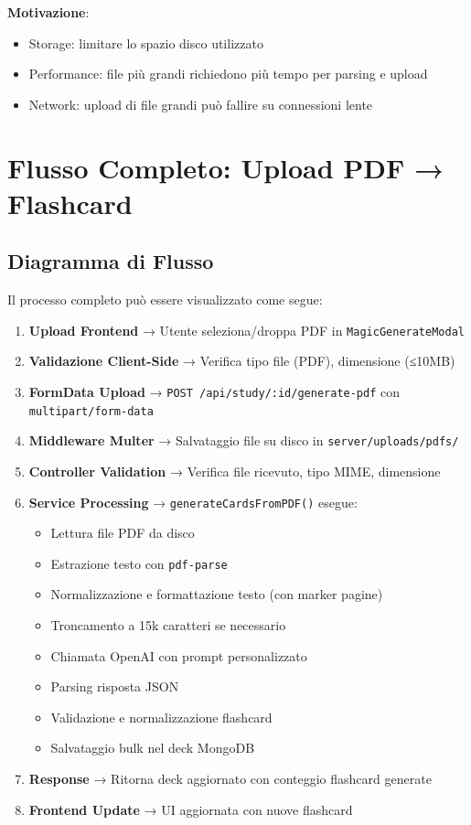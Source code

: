 \documentclass[11pt,a4paper]{article}
\begin{document}
\textbf{Motivazione}:
\begin{itemize}
    \item Storage: limitare lo spazio disco utilizzato
    \item Performance: file più grandi richiedono più tempo per parsing e upload
    \item Network: upload di file grandi può fallire su connessioni lente
\end{itemize}

\section{Flusso Completo: Upload PDF → Flashcard}

\subsection{Diagramma di Flusso}

Il processo completo può essere visualizzato come segue:

\begin{enumerate}
    \item \textbf{Upload Frontend} → Utente seleziona/droppa PDF in \texttt{MagicGenerateModal}
    \item \textbf{Validazione Client-Side} → Verifica tipo file (PDF), dimensione (≤10MB)
    \item \textbf{FormData Upload} → \texttt{POST /api/study/:id/generate-pdf} con \texttt{multipart/form-data}
    \item \textbf{Middleware Multer} → Salvataggio file su disco in \texttt{server/uploads/pdfs/}
    \item \textbf{Controller Validation} → Verifica file ricevuto, tipo MIME, dimensione
    \item \textbf{Service Processing} → \texttt{generateCardsFromPDF()} esegue:
        \begin{itemize}
            \item Lettura file PDF da disco
            \item Estrazione testo con \texttt{pdf-parse}
            \item Normalizzazione e formattazione testo (con marker pagine)
            \item Troncamento a 15k caratteri se necessario
            \item Chiamata OpenAI con prompt personalizzato
            \item Parsing risposta JSON
            \item Validazione e normalizzazione flashcard
            \item Salvataggio bulk nel deck MongoDB
        \end{itemize}
    \item \textbf{Response} → Ritorna deck aggiornato con conteggio flashcard generate
    \item \textbf{Frontend Update} → UI aggiornata con nuove flashcard
\end{enumerate}
\end{document}
